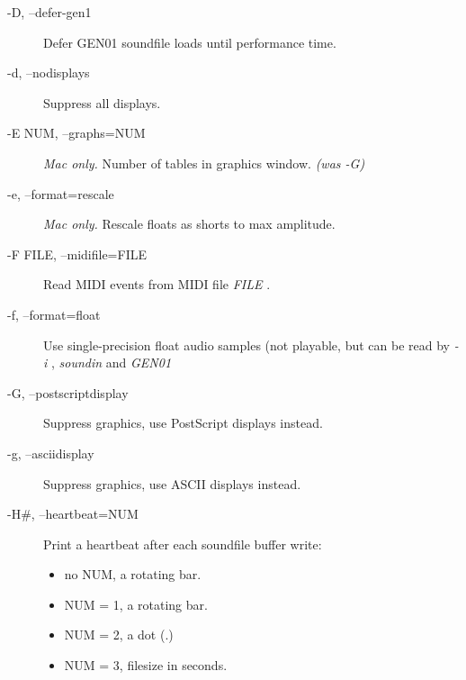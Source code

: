 \begin{description}
\item[-D, --defer-gen1]

  Defer GEN01 soundfile loads until performance time. 

\item[-d, --nodisplays]

  Suppress all displays. 

\item[-E NUM, --graphs=NUM]

 \emph{Mac only.}
 Number of tables in graphics window. \emph{(was -G)}


\item[-e, --format=rescale]

 \emph{Mac only.}
 Rescale floats as shorts to max amplitude. 

\item[-F FILE, --midifile=FILE]

  Read MIDI events from MIDI file \emph{FILE}
. 

\item[-f, --format=float]

  Use single-precision float audio samples (not playable, but can be read by \emph{-i}
, \emph{soundin}
 and \emph{GEN01}


\item[-G, --postscriptdisplay]

  Suppress graphics, use PostScript displays instead. 

\item[-g, --asciidisplay]

  Suppress graphics, use ASCII displays instead. 

\item[-H\#, --heartbeat=NUM]

  Print a heartbeat after each soundfile buffer write: 


 
\begin{itemize}
\item 

 no NUM, a rotating bar.

\item 

 NUM = 1, a rotating bar.

\item 

 NUM = 2, a dot (.)

\item 

 NUM = 3, filesize in seconds.


\end{itemize}
\end{description}
